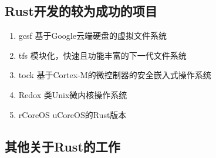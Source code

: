 \documentclass{ctexart}
\begin{document}
\subsection{Rust开发的较为成功的项目}
\begin{enumerate}
\item gcsf 基于Google云端硬盘的虚拟文件系统
\item tfs 模块化，快速且功能丰富的下一代文件系统
\item tock 基于Cortex-M的微控制器的安全嵌入式操作系统
\item Redox 类Unix微内核操作系统
\item rCoreOS uCoreOS的Rust版本
\end{enumerate}
\subsection{其他关于Rust的工作}
\end{document}
